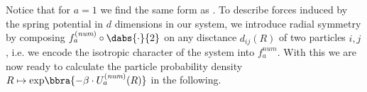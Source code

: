 Notice that for $a = 1$ we find the same form as \cite{Jacquin_2010}. To describe forces induced by the spring potential in $d$ dimensions in our system, we introduce radial symmetry by composing $f_a^{(\textit{num})}\circ\dabs{\cdot}{2}$ on any disctance $d_{ij}(R)$ of two particles $i,j$, i.e. we encode the isotropic character of the system into $f^{\textit{num}}_a$. With this we are now ready to calculate the particle probability density $R\mapsto {\exp}\bbra{-\beta\cdot U_a^{(\textit{num})}(R)}$ in the following.